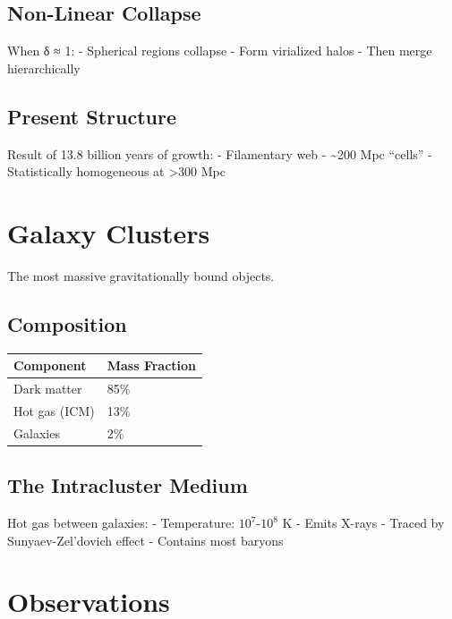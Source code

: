 \documentclass[
  11pt,
  letterpaper,
  twoside,
  openright]{book}
\begin{document}
\subsection{Non-Linear Collapse}\label{non-linear-collapse}

When δ ≈ 1: - Spherical regions collapse - Form virialized halos - Then
merge hierarchically

\subsection{Present Structure}\label{present-structure}

Result of 13.8 billion years of growth: - Filamentary web -
\textasciitilde200 Mpc ``cells'' - Statistically homogeneous at
\textgreater300 Mpc

\section{Galaxy Clusters}\label{galaxy-clusters}

The most massive gravitationally bound objects.

\subsection{Composition}\label{composition}

\begin{longtable}[]{@{}ll@{}}
\toprule\noalign{}
Component & Mass Fraction \\
\midrule\noalign{}
\endhead
\bottomrule\noalign{}
\endlastfoot
Dark matter & 85\% \\
Hot gas (ICM) & 13\% \\
Galaxies & 2\% \\
\end{longtable}

\subsection{The Intracluster Medium}\label{the-intracluster-medium}

Hot gas between galaxies: - Temperature: \(10^7\)-\(10^8\) K - Emits
X-rays - Traced by Sunyaev-Zel'dovich effect - Contains most baryons

\section{Observations}\label{observations}
\end{document}
